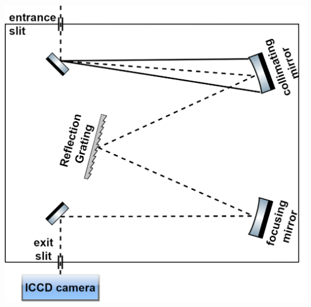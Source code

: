 \documentclass[openany]{book}
\begin{document}
\includegraphics[width=\textwidth]{figures/results/spectro/spectrometer.png}
\end{document}
